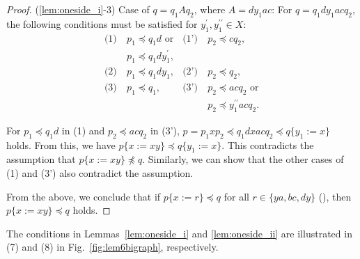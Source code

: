 \begin{proof}
\smallskip

\noindent
(\ref{lem:oneside_i}-3) Case of $q=q_{1}Aq_{2}$, where $A = dy_{1}ac$:
For $q=q_{1}dy_{1}acq_{2}$, the following conditions must be satisfied for $y_{1}^{\prime},y_{1}^{\prime\prime}\in X$:
\begin{align*}
  \textrm{(1)}~& p_{1} \preceq q_{1}d \mbox{~or} & \textrm{(1')}~& p_{2} \preceq cq_{2}, \\
  &  p_{1} \preceq q_{1}dy_{1}^{\prime}, & & \\
  \textrm{(2)}~& p_{1} \preceq q_{1}dy_{1}, & \textrm{(2')}~& p_{2} \preceq q_{2}, \\
  \textrm{(3)}~& p_{1} \preceq q_{1}, & \textrm{(3')}~& p_{2} \preceq acq_{2} \mbox{~or}\\
  & & & p_{2} \preceq y_{1}^{\prime\prime}acq_{2}.
\end{align*}

For $p_{1} \preceq q_{1}d$ in (1) and $p_{2} \preceq acq_{2}$ in (3'), $p = p_{1}xp_{2} \preceq q_{1}dxacq_{2} \preceq q\{y_{1}:=x\}$ holds. From this, we have $p\{x:=xy\} \preceq q\{y_{1}:=x\}$. This contradicts the assumption that $p\{x:=xy\} \not\preceq q$. Similarly, we can show that the other cases of (1) and (3') also contradict the assumption.

From the above, we conclude that if $p \{ x := r \} \preceq q$ for all $r \in \{ ya, bc, dy \}$ (\TheConditionB), then $p \{ x := xy \} \preceq q$ holds.
\end{proof}

The conditions in Lemmas~\ref{lem:oneside_i} and \ref{lem:oneside_ii} are illustrated in (7) and (8) in Fig.~\ref{fig:lem6bigraph}, respectively.

